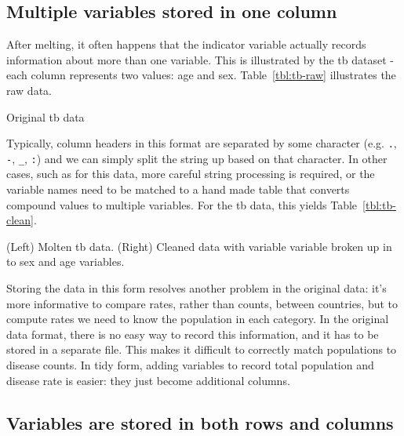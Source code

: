 \documentclass[oneside]{article}
\begin{document}
\subsection{Multiple variables stored in one column}

After melting, it often happens that the indicator variable actually records information about more than one variable. This is illustrated by the tb dataset - each column represents two values: age and sex.  Table~\ref{tbl:tb-raw} illustrates the raw data. 

\begin{table}[htbp]
  \centering
  
  \caption{Original tb data}
  \label{tbl:tb-raw}
\end{table}

Typically, column headers in this format are separated by some character (e.g. {\tt .}, {\tt -}, {\tt \_}, {\tt :}) and we can simply split the string up based on that character. In other cases, such as for this data, more careful string processing is required, or the variable names need to be matched to a hand made table that converts compound values to multiple variables. For the tb data, this yields Table~\ref{tbl:tb-clean}.

\begin{table}[htbp]
  \centering
  
  
  \caption{(Left) Molten tb data. (Right) Cleaned data with variable variable broken up in to sex and age variables.}
  \label{tbl:tb-clean}
\end{table}

Storing the data in this form resolves another problem in the original data: it's more informative to compare rates, rather than counts, between countries, but to compute rates we need to know the population in each category. In the original data format, there is no easy way to record this information, and it has to be stored in a separate file. This makes it difficult to correctly match populations to disease counts. In tidy form, adding variables to record total population and disease rate is easier: they just become additional columns.

\subsection{Variables are stored in both rows and columns}
\end{document}
